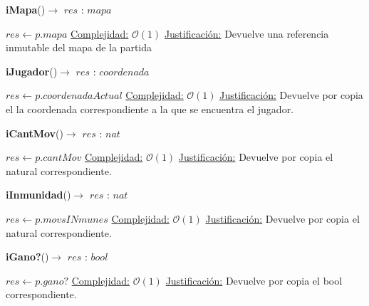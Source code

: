 \documentclass[10pt, a4paper]{article}
\begin{document}
\begin{Algoritmos}
    \begin{algorithm}{\textbf{iMapa}()$\to$ $res$ : $mapa$}
        \begin{algorithmic}
            \State $res \gets p.mapa$
            \Statex \underline{Complejidad:} $\mathcal{O}(1)$
            \Statex \underline{Justificación:} Devuelve una referencia inmutable del mapa de la partida
        \end{algorithmic}
    \end{algorithm}
    
    \begin{algorithm}{\textbf{iJugador}()$\to$ $res$ : $coordenada$}
        \begin{algorithmic}
            \State $res \gets p.coordenadaActual$
            \Statex \underline{Complejidad:} $\mathcal{O}(1)$
            \Statex \underline{Justificación:} Devuelve por copia el la coordenada correspondiente a la que se encuentra el jugador.
        \end{algorithmic}
    \end{algorithm}
    
    \begin{algorithm}{\textbf{iCantMov}()$\to$ $res$ : $nat$}
        \begin{algorithmic}
            \State $res \gets p.cantMov$
            \Statex \underline{Complejidad:} $\mathcal{O}(1)$
            \Statex \underline{Justificación:} Devuelve por copia el natural correspondiente.
        \end{algorithmic}
    \end{algorithm}
    
    \begin{algorithm}{\textbf{iInmunidad}()$\to$ $res$ : $nat$}
        \begin{algorithmic}
            \State $res \gets p.movsINmunes$
            \Statex \underline{Complejidad:} $\mathcal{O}(1)$
            \Statex \underline{Justificación:} Devuelve por copia el natural correspondiente.
        \end{algorithmic}
    \end{algorithm}
    
    \begin{algorithm}{\textbf{iGano?}()$\to$ $res$ : $bool$}
        \begin{algorithmic}
            \State $res \gets p.gano?$
            \Statex \underline{Complejidad:} $\mathcal{O}(1)$
            \Statex \underline{Justificación:} Devuelve por copia el bool correspondiente.
        \end{algorithmic}
    \end{algorithm}
    

\end{Algoritmos}
\end{document}
